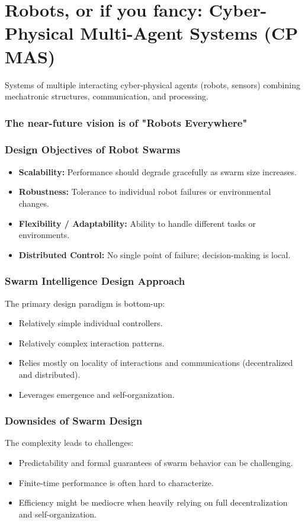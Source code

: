 \chapter*{Robots, or if you fancy: Cyber-Physical Multi-Agent Systems (CP MAS)}
Systems of multiple interacting cyber-physical agents (robots, sensors) combining mechatronic structures, communication, and processing.

\subsection*{The near-future vision is of "Robots Everywhere"}

\subsection*{Design Objectives of Robot Swarms}
\begin{itemize}
    \item \textbf{Scalability:} Performance should degrade gracefully as swarm size increases.
    \item \textbf{Robustness:} Tolerance to individual robot failures or environmental changes.
    \item \textbf{Flexibility / Adaptability:} Ability to handle different tasks or environments.
    \item \textbf{Distributed Control:} No single point of failure; decision-making is local.
\end{itemize}
\subsection*{Swarm Intelligence Design Approach}
The primary design paradigm is bottom-up:

\begin{itemize}
    \item Relatively simple individual controllers.
    \item Relatively complex interaction patterns.
    \item Relies mostly on locality of interactions and communications (decentralized and distributed).
    \item Leverages emergence and self-organization.
\end{itemize}

\subsection*{Downsides of Swarm Design}
The complexity leads to challenges:
\begin{itemize}
    \item Predictability and formal guarantees of swarm behavior can be challenging.
    \item Finite-time performance is often hard to characterize.
    \item Efficiency might be mediocre when heavily relying on full decentralization and self-organization.
\end{itemize}

